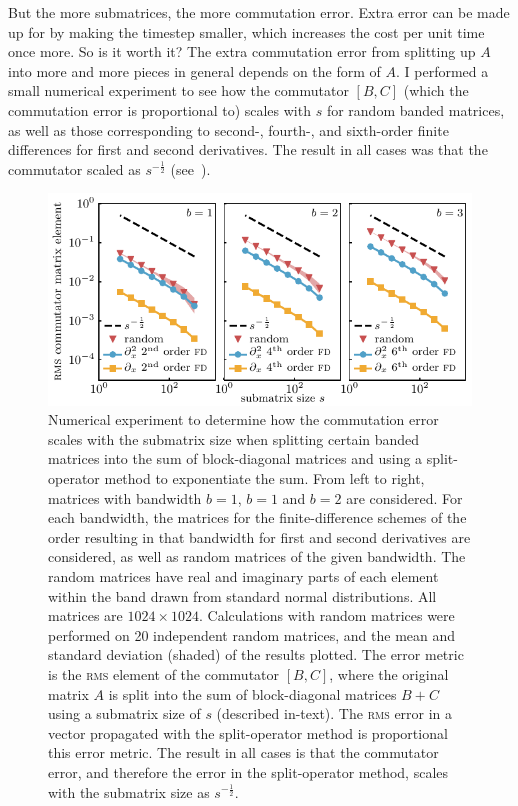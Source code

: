 But the more submatrices, the more commutation error. Extra error can be made up for by making the timestep smaller, which increases the cost per unit time once more. So is it worth it? The extra commutation error from splitting up $A$ into more and more pieces in general depends on the form of $A$. I performed a small numerical experiment to see how the commutator $[B, C]$ (which the commutation error is proportional to) scales with $s$ for random banded matrices, as well as those corresponding to second-, fourth-, and sixth-order finite differences for first and second derivatives. The result in all cases was that the commutator scaled as $s^{-\frac12}$ (see~).

\begin{figure}[t]
    \centerfloat
    \includegraphics[width=\textwidth]{figures/numerics/commutation_error.pdf}
    \caption{Numerical experiment to determine how the commutation error scales with the submatrix size when splitting certain banded matrices into the sum of block-diagonal matrices and using a split-operator method to exponentiate the sum. From left to right, matrices with bandwidth $b=1$, $b=1$ and $b=2$ are considered. For each bandwidth, the matrices for the finite-difference schemes of the order resulting in that bandwidth for first and second derivatives are considered, as well as random matrices of the given bandwidth. The random matrices have real and imaginary parts of each element within the band drawn from standard normal distributions. All matrices are $1024\times1024$. Calculations with random matrices were performed on 20 independent random matrices, and the mean and standard deviation (shaded) of the results plotted. The error metric is the \textsc{rms} element of the commutator $[B, C]$, where the original matrix $A$ is split into the sum of block-diagonal matrices $B + C$ using a submatrix size of $s$ (described in-text). The \textsc{rms} error in a vector propagated with the split-operator method is proportional this error metric. The result in all cases is that the commutator error, and therefore the error in the split-operator method, scales with the submatrix size as $s^{-\frac12}$.}
    \label{fig:commutation_error}
\end{figure}

